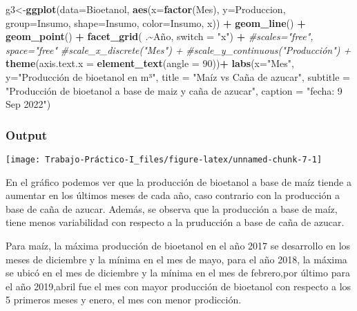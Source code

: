 \documentclass[
]{article}
\newenvironment{Shaded}{\begin{snugshade}}{\end{snugshade}}
\newcommand{\AttributeTok}[1]{\textcolor[rgb]{0.13,0.29,0.53}{#1}}
\newcommand{\CommentTok}[1]{\textcolor[rgb]{0.56,0.35,0.01}{\textit{#1}}}
\newcommand{\DecValTok}[1]{\textcolor[rgb]{0.00,0.00,0.81}{#1}}
\newcommand{\FunctionTok}[1]{\textcolor[rgb]{0.13,0.29,0.53}{\textbf{#1}}}
\newcommand{\NormalTok}[1]{#1}
\newcommand{\OtherTok}[1]{\textcolor[rgb]{0.56,0.35,0.01}{#1}}
\newcommand{\SpecialCharTok}[1]{\textcolor[rgb]{0.81,0.36,0.00}{\textbf{#1}}}
\newcommand{\StringTok}[1]{\textcolor[rgb]{0.31,0.60,0.02}{#1}}
\begin{document}
\begin{Shaded}
\begin{Highlighting}[]
\NormalTok{g3}\OtherTok{\textless{}{-}}\FunctionTok{ggplot}\NormalTok{(}\AttributeTok{data=}\NormalTok{Bioetanol, }
       \FunctionTok{aes}\NormalTok{(}\AttributeTok{x=}\FunctionTok{factor}\NormalTok{(Mes),}
           \AttributeTok{y=}\NormalTok{Produccion, }
           \AttributeTok{group=}\NormalTok{Insumo,}
           \AttributeTok{shape=}\NormalTok{Insumo,}
           \AttributeTok{color=}\NormalTok{Insumo,}
\NormalTok{           x)) }\SpecialCharTok{+} 
  \FunctionTok{geom\_line}\NormalTok{() }\SpecialCharTok{+} 
  \FunctionTok{geom\_point}\NormalTok{() }\SpecialCharTok{+}
  \FunctionTok{facet\_grid}\NormalTok{( .}\SpecialCharTok{\textasciitilde{}}\NormalTok{Año, }\AttributeTok{switch =} \StringTok{"x"}\NormalTok{) }\SpecialCharTok{+}  \CommentTok{\#scales="free", space="free"}
  \CommentTok{\#scale\_x\_discrete("Mes") +}
  \CommentTok{\#scale\_y\_continuous("Producción") +}
  \FunctionTok{theme}\NormalTok{(}\AttributeTok{axis.text.x =} \FunctionTok{element\_text}\NormalTok{(}\AttributeTok{angle =} \DecValTok{90}\NormalTok{))}\SpecialCharTok{+}
  \FunctionTok{labs}\NormalTok{(}\AttributeTok{x=}\StringTok{"Mes"}\NormalTok{, }\AttributeTok{y=}\StringTok{"Producción de bioetanol en m³"}\NormalTok{, }\AttributeTok{title =} \StringTok{"Maíz vs Caña de azucar"}\NormalTok{, }
       \AttributeTok{subtitle =} \StringTok{"Producción de bioetanol a base de maiz y caña de azucar"}\NormalTok{, }
       \AttributeTok{caption =} \StringTok{"fecha: 9 Sep 2022"}\NormalTok{) }
\end{Highlighting}
\end{Shaded}

\subsubsection{Output}\label{output-2}

\begin{center}\texttt{[image: Trabajo-Práctico-I\_files/figure-latex/unnamed-chunk-7-1]} \end{center}

En el gráfico podemos ver que la producción de bioetanol a base de maíz
tiende a aumentar en los últimos meses de cada año, caso contrario con
la producción a base de caña de azucar. Además, se observa que la
producción a base de maíz, tiene menos variabilidad con respecto a la
pruducción a base de caña de azucar.

Para maíz, la máxima producción de bioetanol en el año 2017 se
desarrollo en los meses de diciembre y la mínima en el mes de mayo, para
el año 2018, la máxima se ubicó en el mes de diciembre y la mínima en el
mes de febrero,por último para el año 2019,abril fue el mes con mayor
producción de bioetanol con respecto a los 5 primeros meses y enero, el
mes con menor prodicción.
\end{document}
